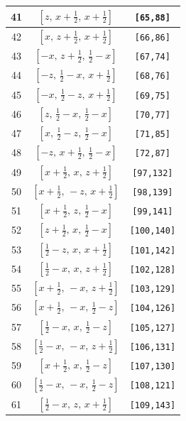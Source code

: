 \documentclass[fleqn,8pt]{jsarticle}
\begin{document}
\begin{longtable}{ccc}
41 & $\left[ z,\, x + \frac{1}{2},\, x + \frac{1}{2} \right]$ & {\tt [65,88]} \\ \hline
42 & $\left[ x,\, z + \frac{1}{2},\, x + \frac{1}{2} \right]$ & {\tt [66,86]} \\ \hline
43 & $\left[ - x,\, z + \frac{1}{2},\, \frac{1}{2} - x \right]$ & {\tt [67,74]} \\ \hline
44 & $\left[ - z,\, \frac{1}{2} - x,\, x + \frac{1}{2} \right]$ & {\tt [68,76]} \\ \hline
45 & $\left[ - x,\, \frac{1}{2} - z,\, x + \frac{1}{2} \right]$ & {\tt [69,75]} \\ \hline
46 & $\left[ z,\, \frac{1}{2} - x,\, \frac{1}{2} - x \right]$ & {\tt [70,77]} \\ \hline
47 & $\left[ x,\, \frac{1}{2} - z,\, \frac{1}{2} - x \right]$ & {\tt [71,85]} \\ \hline
48 & $\left[ - z,\, x + \frac{1}{2},\, \frac{1}{2} - x \right]$ & {\tt [72,87]} \\ \hline
49 & $\left[ x + \frac{1}{2},\, x,\, z + \frac{1}{2} \right]$ & {\tt [97,132]} \\ \hline
50 & $\left[ x + \frac{1}{2},\, - z,\, x + \frac{1}{2} \right]$ & {\tt [98,139]} \\ \hline
51 & $\left[ x + \frac{1}{2},\, z,\, \frac{1}{2} - x \right]$ & {\tt [99,141]} \\ \hline
52 & $\left[ z + \frac{1}{2},\, x,\, \frac{1}{2} - x \right]$ & {\tt [100,140]} \\ \hline
53 & $\left[ \frac{1}{2} - z,\, x,\, x + \frac{1}{2} \right]$ & {\tt [101,142]} \\ \hline
54 & $\left[ \frac{1}{2} - x,\, x,\, z + \frac{1}{2} \right]$ & {\tt [102,128]} \\ \hline
55 & $\left[ x + \frac{1}{2},\, - x,\, z + \frac{1}{2} \right]$ & {\tt [103,129]} \\ \hline
56 & $\left[ x + \frac{1}{2},\, - x,\, \frac{1}{2} - z \right]$ & {\tt [104,126]} \\ \hline
57 & $\left[ \frac{1}{2} - x,\, x,\, \frac{1}{2} - z \right]$ & {\tt [105,127]} \\ \hline
58 & $\left[ \frac{1}{2} - x,\, - x,\, z + \frac{1}{2} \right]$ & {\tt [106,131]} \\ \hline
59 & $\left[ x + \frac{1}{2},\, x,\, \frac{1}{2} - z \right]$ & {\tt [107,130]} \\ \hline
60 & $\left[ \frac{1}{2} - x,\, - x,\, \frac{1}{2} - z \right]$ & {\tt [108,121]} \\ \hline
61 & $\left[ \frac{1}{2} - x,\, z,\, x + \frac{1}{2} \right]$ & {\tt [109,143]} \\ \hline

\end{longtable}
\end{document}
